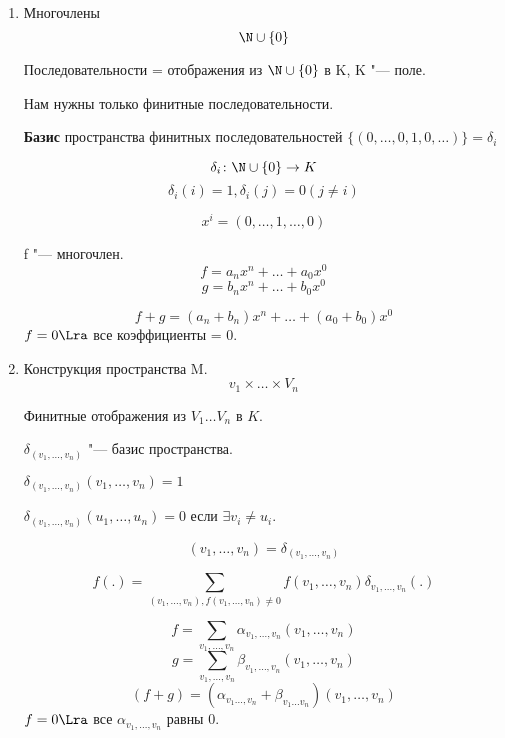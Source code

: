 \begin{exmp}\hfill
	\begin{enumerate}
	\item Многочлены
	 $$\N \cup \{0\}$$

	 Последовательности = отображения из $\N \cup \{0\}$ в K, K "--- поле.

	 Нам нужны только финитные последовательности.

	 \textbf{Базис} пространства финитных последовательностей $\{(0,\dots, 0, 1, 0, \dots)\} = \delta_i$

	 $$\delta_i\colon \N\cup\{0\} \to K$$
	 $$\delta_i(i) = 1, \delta_i(j) = 0(j \ne i)$$

	 $$x^i = (0, \dots, 1, \dots, 0)$$

	 f "--- многочлен.
	 $$f = a_nx^n + \dots + a_0x^0$$
	 $$g = b_nx^n + \dots + b_0x^0$$

	 $$f + g = (a_n + b_n)x^n + \dots +(a_0 + b_0)x^0$$
	 $f = 0 \Lra$ все коэффициенты = 0.

	\item Конструкция пространства M.
	$$v_1 \times \dots \times V_n$$

	Финитные отображения из $V_1 \dots V_n$ в $K$.

	$\delta_{(v_1, \dots, v_n)}$ "--- базис пространства.

	$\delta_{(v_1, \dots, v_n)}(v_1, \dots, v_n) = 1$

	$\delta_{(v_1, \dots, v_n)}(u_1, \dots, u_n) = 0$ если $\exists v_i \ne u_i$.

	$$(v_1, \dots, v_n) = \delta_{(v_1, \dots, v_n)}$$

	$$f(.) = \sum_{(v_1, \dots, v_n), f(v_1, \dots, v_n) \ne 0} f(v_1, \dots, v_n)\delta_{v_1, \dots, v_n}(.)$$

	$$f = \sum_{v_1, \dots, v_n}\alpha_{v_1, \dots, v_n}(v_1, \dots, v_n)$$
	$$g = \sum_{v_1, \dots, v_n}\beta_{v_1, \dots, v_n}(v_1, \dots, v_n)$$
	$$(f + g) = (\alpha_{v_1 \dots, v_n} + \beta_{v_1 \dots v_n})(v_1, \dots, v_n)$$
	$f = 0 \Lra$  все $\alpha_{v_1, \dots, v_n}$  равны 0.
	\end{enumerate}
\end{exmp}
